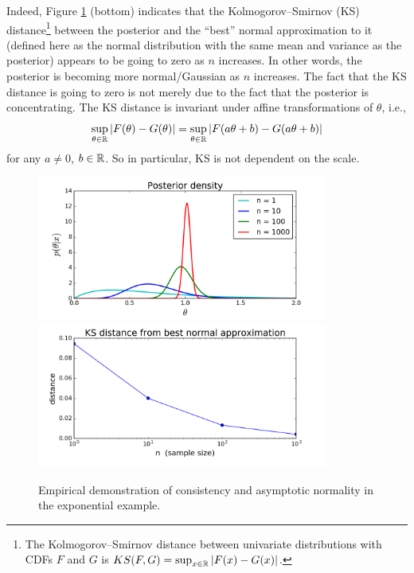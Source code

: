 \documentclass[12pt]{article}
\begin{document}
Indeed, Figure \ref{figure:example-1} (bottom) indicates that the Kolmogorov--Smirnov (KS) distance\footnote{The Kolmogorov--Smirnov distance between univariate distributions with CDFs $F$ and $G$ is $KS(F,G) = \sup_{x\in\mathbb{R}} |F(x)-G(x)|$.} between the posterior and the ``best'' normal approximation to it (defined here as the normal distribution with the same mean and variance as the posterior) appears to be going to zero as $n$ increases. In other words, the posterior is becoming more normal/Gaussian as $n$ increases.
The fact that the KS distance is going to zero is not merely due to the fact that the posterior is concentrating. The KS distance is invariant under affine transformations of $\theta$, i.e., $$ \sup_{\theta\in\mathbb{R}} |F(\theta)-G(\theta)| = \sup_{\theta\in\mathbb{R}} |F(a \theta + b)-G(a \theta + b)|$$ for any $a\neq 0$, $b\in \mathbb{R}$. So in particular, KS is not dependent on the scale.

\begin{figure}
\begin{center}
\includegraphics[trim=0 0 0 0, clip, width=0.85\textwidth]{code/ex1-pdf.png}
\includegraphics[trim=0 0 0 0, clip, width=0.85\textwidth]{code/ex1-dist.png}
\end{center}
\caption{Empirical demonstration of consistency and asymptotic normality in the exponential example.}
\label{figure:example-1}
\end{figure}
\end{document}
